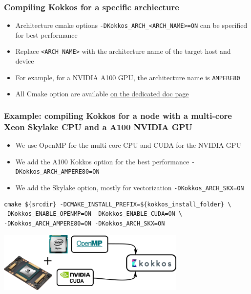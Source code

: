 \documentclass[aspectratio=169]{beamer}
\begin{document}

\begin{frame}[fragile]
    \frametitle{Compiling Kokkos for a specific archiecture}

\begin{itemize}
    \item Architecture cmake options \texttt{-DKokkos\_ARCH\_<ARCH\_NAME>=ON} can be specified for best performance
    \item Replace \texttt{<ARCH\_NAME>} with the architecture name of the target host and device
    \item For example, for a NVIDIA A100 GPU, the architecture name is \texttt{AMPERE80}
    \item All Cmake option are available \href{https://kokkos.org/kokkos-core-wiki/keywords.html#}{on the dedicated doc page}
\end{itemize}

\end{frame}


\begin{frame}[fragile]
    \frametitle{Example: compiling Kokkos for a node with a multi-core Xeon Skylake CPU and a A100 NVIDIA GPU} 

\begin{itemize}
    \item We use OpenMP for the multi-core CPU and CUDA for the NVIDIA GPU
    \item We add the A100 Kokkos option for the best performance \texttt{-DKokkos\_ARCH\_AMPERE80=ON}
    \item We add the Skylake option, mostly for vectorization \texttt{-DKokkos\_ARCH\_SKX=ON}
\end{itemize}

\footnotesize
\begin{verbatim}
cmake ${srcdir} -DCMAKE_INSTALL_PREFIX=${kokkos_install_folder} \
-DKokkos_ENABLE_OPENMP=ON -DKokkos_ENABLE_CUDA=ON \
-DKokkos_ARCH_AMPERE80=ON -DKokkos_ARCH_SKX=ON
\end{verbatim}

\hspace{0.5cm}

\centering
\includegraphics[width=0.7\textwidth]{../../images/kokkos_a100_backend.png}

\end{frame}
\end{document}
